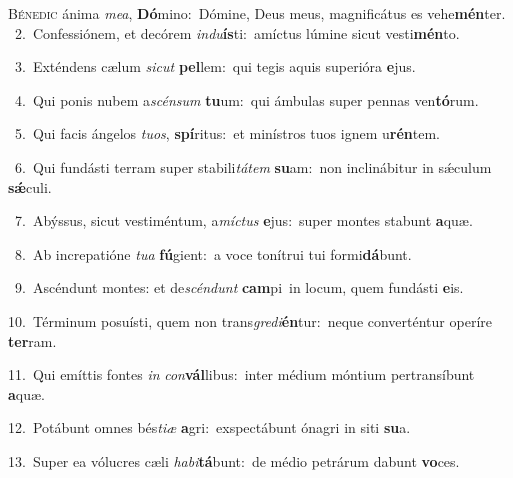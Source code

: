 \lettrine{\initial\textcolor{\initialcolor}{B}}{énedic} ánima \textit{me}\-\textit{a}, \textbf{Dó}\-mino:~\star Dómine, Deus meus, magnificátus es vehe\-\textbf{mén}\-ter.\\
{\numbfont\textcolor{\numbcolor}{~2.}}~Confessiónem, et decórem \textit{ind}\-\textit{u}\textbf{ís}ti:~\star amíctus lúmine sicut vesti\-\textbf{mén}\-to.\par
{\numbfont\textcolor{\numbcolor}{~3.}}~Exténdens cælum \textit{sic}\-\textit{ut} \textbf{pel}\-lem:~\star qui tegis aquis superióra \textbf{e}\-jus.\par
{\numbfont\textcolor{\numbcolor}{~4.}}~Qui ponis nubem a\-\textit{scén}\-\textit{sum} \textbf{tu}\-um:~\star qui ámbulas super pennas ven\-\textbf{tó}\-rum.\par
{\numbfont\textcolor{\numbcolor}{~5.}}~Qui facis ángelos \textit{tu}\-\textit{os}, \textbf{spí}\-ritus:~\star et minístros tuos ignem u\-\textbf{rén}\-tem.\par
{\numbfont\textcolor{\numbcolor}{~6.}}~Qui fundásti terram super stabili\-\textit{tá}\-\textit{tem} \textbf{su}\-am:~\star non inclinábitur in sǽculum \textbf{sǽ}\-culi.\par
{\numbfont\textcolor{\numbcolor}{~7.}}~Abýssus, sicut vestiméntum, a\-\textit{míc}\-\textit{tus} \textbf{e}\-jus:~\star super montes stabunt \textbf{a}\-quæ.\par
{\numbfont\textcolor{\numbcolor}{~8.}}~Ab increpatióne \textit{tu}\-\textit{a} \textbf{fú}\-gient:~\star a voce tonítrui tui formi\-\textbf{dá}\-bunt.\par
{\numbfont\textcolor{\numbcolor}{~9.}}~Ascéndunt montes: et de\-\textit{scén}\-\textit{dunt} \textbf{cam}\-pi~\star in locum, quem fundásti \textbf{e}\-is.\par
{\numbfont\textcolor{\numbcolor}{10.}}~Términum posuísti, quem non trans\-\textit{gre}\-\textit{di}\textbf{én}tur:~\star neque converténtur operíre \textbf{ter}\-ram.\par
{\numbfont\textcolor{\numbcolor}{11.}}~Qui emíttis fontes \textit{in} \textit{con}\-\textbf{vál}libus:~\star inter médium móntium pertransíbunt \textbf{a}\-quæ.\par
{\numbfont\textcolor{\numbcolor}{12.}}~Potábunt omnes bés\-\textit{ti}\-\textit{æ} \textbf{a}\-gri:~\star exspectábunt ónagri in siti \textbf{su}\-a.\par
{\numbfont\textcolor{\numbcolor}{13.}}~Super ea vólucres cæli \textit{ha}\-\textit{bi}\textbf{tá}bunt:~\star de médio petrárum dabunt \textbf{vo}\-ces.\par
